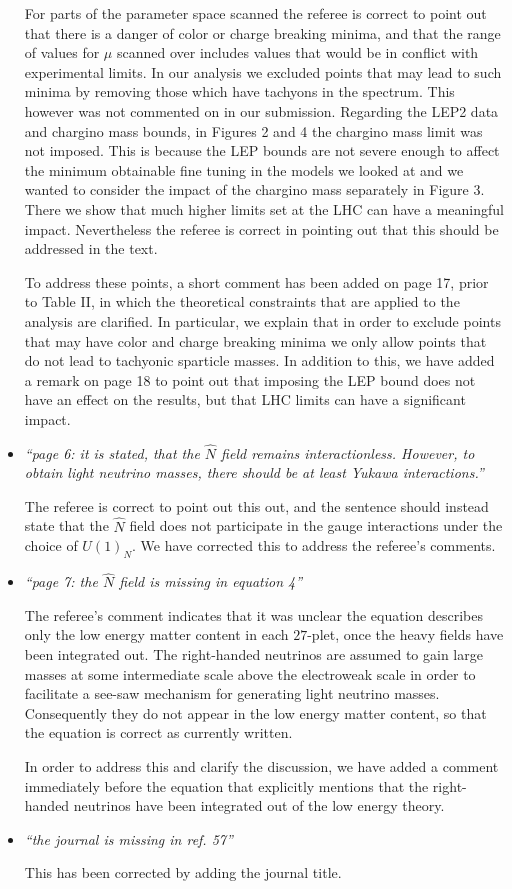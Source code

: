 \documentclass[12pt]{article}
\begin{document}
\begin{itemize}
For parts of the parameter space scanned the referee is correct to
point out that there is a danger of color or charge breaking minima,
and that the range of values for $\mu$ scanned over includes values
that would be in conflict with experimental limits.  In our analysis
we excluded points that may lead to such minima by removing those
which have tachyons in the spectrum.  This however was not commented on
in our submission.  Regarding the LEP2 data and chargino mass bounds,
in Figures 2 and 4 the chargino mass limit was not imposed.  This is
because the LEP bounds are not severe enough to affect the minimum
obtainable fine tuning in the models we looked at and we wanted to
consider the impact of the chargino mass separately in Figure 3.  There
we show that much higher limits set at the LHC can have a meaningful
impact.  Nevertheless the referee is correct in pointing out that this should
be addressed in the text.

To address these points, a short comment has been added on page 17,
prior to Table II, in which the theoretical constraints that are applied to
the analysis are clarified.  In particular, we explain that in order to
exclude points that may have color and charge breaking minima we only allow
points that do not lead to tachyonic sparticle masses.  In addition to this,
we have added a remark on page 18 to point out that imposing the LEP bound
does not have an effect on the results, but that LHC limits can have a
significant impact.

\item {\it ``page 6: it is stated, that the $\hat N$ field remains
interactionless. However, to obtain light neutrino masses, there should be
at least Yukawa interactions.''}

The referee is correct to point out this out, and the sentence should instead
state that the $\hat N$ field does not participate in the gauge interactions
under the choice of $U(1)_N$. We have corrected this to address the referee's
comments.

\item {\it ``page 7: the $\hat N$ field is missing in equation 4''}

The referee's comment indicates that it was unclear the equation describes
only the low energy matter content in each $27$-plet, once the heavy fields
have been integrated out. The right-handed neutrinos are assumed to gain
large masses at some intermediate scale above the electroweak scale in order
to facilitate a see-saw mechanism for generating light neutrino masses.
Consequently they do not appear in the low energy matter content, so that
the equation is correct as currently written.

In order to address this and clarify the discussion, we have added a comment
immediately before the equation that explicitly mentions that the right-handed
neutrinos have been integrated out of the low energy theory.

\item {\it ``the journal is missing in ref. 57''}

This has been corrected by adding the journal title.


\end{itemize}
\end{document}

